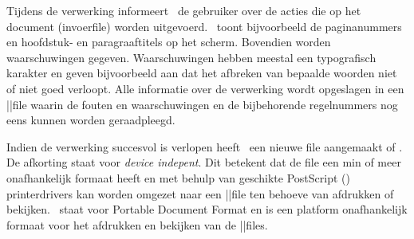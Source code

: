 Tijdens de verwerking informeert \CONTEXT\ de gebruiker over
de acties die op het document (invoerfile) worden
uitgevoerd. \CONTEXT\ toont bijvoorbeeld de paginanummers en
hoofdstuk- en paragraaftitels op het scherm. Bovendien
worden waarschuwingen gegeven. Waarschuwingen hebben meestal
een typografisch karakter en geven bijvoorbeeld aan dat het
afbreken van bepaalde woorden niet of niet goed verloopt.
Alle informatie over de verwerking wordt opgeslagen in een
||file waarin de fouten en waarschuwingen en de
bijbehorende regelnummers nog eens kunnen worden
geraadpleegd.

Indien de verwerking succesvol is verlopen heeft \CONTEXT\
een nieuwe file aangemaakt  of
. De afkorting  staat voor {\em
device indepent}. Dit betekent dat de file een min of meer
onafhankelijk formaat heeft en met behulp van geschikte
PostScript (\PS) printerdrivers kan worden omgezet naar een
\PS||file ten behoeve van afdrukken of bekijken. \PDF\ staat
voor Portable Document Format en is een platform
onafhankelijk formaat voor het afdrukken en bekijken van
de \PDF||files.

\stoponderdeel
